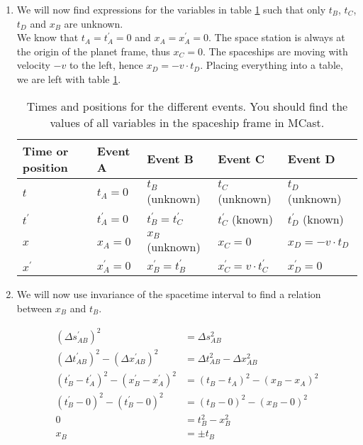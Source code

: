 \documentclass[a4paper,10pt,english]{article}
\begin{document}
\begin{enumerate}
\item We will now find expressions for the variables in table \ref{table:ex_2A_5} such that only $t_{B}$, $t_{C}$, $t_{D}$ and $x_{B}$ are unknown. 
\\
We know that $t_{A}=t^{\prime}_{A}=0$ and $x_{A}=x^{\prime}_{A}=0$. The space station is always at the origin of the planet frame, thus $x_{C}=0$. The spaceships are moving with velocity $-v$ to the left, hence $x_{D}=-v\cdot t_{D}$. Placing everything into a table, we are left with table \ref{table:ex_2A_5}.

\begin{table}[H]
  \begin{center}
    \begin{tabular}{| l | l | l | l | l |}
   	\hline
	 Time or position & Event A & Event B & Event C & Event D\\ \hline
	 $t$ & $t_{A}=0$ & $t_{B}$ (unknown) & $t_{C}$ (unknown) & $t_{D}$ (unknown)\\ \hline
	 $t^{\prime}$ & $t^{\prime}_{A}=0$ & $t_{B}^{\prime}=t_{C}^{\prime}$ & $t_{C}^{\prime}$ (known) & $t^{\prime}_{D}$ (known) \\ \hline
	 $x$ & $x_{A}=0$ & $x_{B}$ (unknown) & $x_{C}=0$ & $x_{D}=-v\cdot t_{D}$\\ \hline
	 $x^{\prime}$ & $x^{\prime}_{A}=0$ & $x_{B}^{\prime}=t_{B}^{\prime}$ & $x_{C}^{\prime}=v\cdot t_{C}^{\prime}$ & $x^{\prime}_{D}=0$\\ \hline
	\end{tabular}
    \caption{Times and positions for the different events. You should find the values of all variables in the spaceship frame in MCast.}
    \label{table:ex_2A_5}
  \end{center}
\end{table}
\FloatBarrier

\item We will now use invariance of the spacetime interval to find a relation between $x_{B}$ and $t_{B}$.

\begin{align*}
(\Delta s_{AB}^{\prime})^{2}&=\Delta s_{AB}^{2}\\
(\Delta t_{AB}^{\prime})^{2}-(\Delta x_{AB}^{\prime})^{2}&=\Delta t_{AB}^{2}-\Delta x_{AB}^{2}\\
(t_{B}^{\prime}-t_{A}^{\prime})^{2}-(x_{B}^{\prime}-x_{A}^{\prime})^{2}&=(t_{B}-t_{A})^{2}-(x_{B}-x_{A})^{2}\\
(t_{B}^{\prime}-0)^{2}-(t_{B}^{\prime}-0)^{2}&=(t_{B}-0)^{2}-(x_{B}-0)^{2}\\
0&=t_{B}^{2}-x_{B}^{2}\\
x_{B}&=\pm t_{B}
\end{align*}


\end{enumerate}
\end{document}
